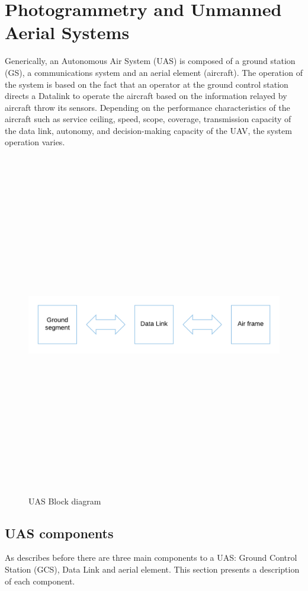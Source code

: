 \section{Photogrammetry and Unmanned Aerial Systems}
Generically, an Autonomous Air System (UAS) is composed of a ground station (GS), a communications system and an aerial element (aircraft). The operation of the system is based on the fact that an operator at the ground control station directs a Datalink to operate the aircraft based on the information relayed by aircraft throw its sensors. Depending on the performance characteristics of the aircraft such as service ceiling, speed, scope, coverage, transmission capacity of the data link, autonomy, and decision-making capacity of the UAV, the system operation varies.\cite{Duran}
\begin{figure}[H]
\centering
\includegraphics[width=15cm,height=15cm,keepaspectratio]{imagenes/UAS_Components.png}
\caption{UAS Block diagram}
\label{fig:block diagram}
\end{figure}

\subsection{UAS components}
As describes before there are three main components to a UAS: Ground Control Station (GCS), Data Link and aerial element. This section presents a description of each component.
